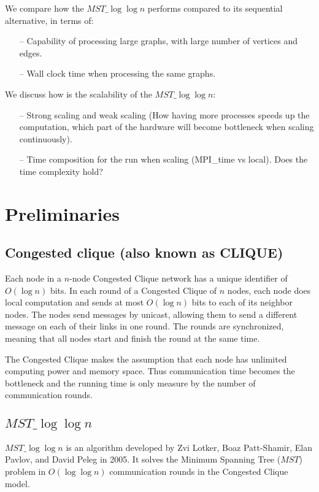 \documentclass[english, 12pt, a4paper, elec, utf8, a-2b, online]{aaltothesis}
\newcommand{\mstalgo}{$MST\_\log\log{n}$}
\begin{document}
We compare how the \mstalgo{} performs compared to its sequential alternative, in terms of:
\begin{itemize}
	\item[--] Capability of processing large graphs, with large number of vertices and edges.
	\item[--] Wall clock time when processing the same graphs.
\end{itemize}
We discuss how is the scalability of the \mstalgo{}:
\begin{itemize}
	\item[--] Strong scaling and weak scaling (How having more processes speeds up the computation, which part of the hardware will become bottleneck when scaling continuously).
	\item[--] Time composition for the run when scaling (MPI\_time vs local). Does the time complexity hold?
\end{itemize}
\clearpage

\section{Preliminaries}
\label{sec:preliminaries}

\subsection{Congested clique (also known as CLIQUE)}
Each node in a $n$-node Congested Clique network has a unique identifier of $O(\log{n})$ bits. In each round of a Congested Clique of $n$ nodes, each node does local computation and sends at most $O(\log{n})$ bits to each of its neighbor nodes. The nodes send messages by unicast, allowing them to send a different message on each of their links in one round. The rounds are synchronized, meaning that all nodes start and finish the round at the same time. \cite{powerCongestClique}

The Congested Clique makes the assumption that each node has unlimited computing power and memory space. Thus communication time becomes the bottleneck and the running time is only measure by the number of communication rounds.
\subsection{\mstalgo{}}
\mstalgo{} is an algorithm developed by Zvi Lotker, Boaz Patt-Shamir, Elan Pavlov, and David Peleg in 2005. It solves the Minimum Spanning Tree ($MST$) problem in $O(\log{\log{n}})$ communication rounds in the Congested Clique model.
\end{document}

